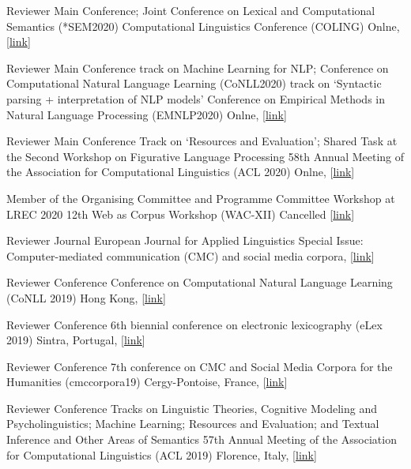 
        {Reviewer}
        {Main Conference; Joint Conference on Lexical and Computational Semantics (*SEM2020)}
        {Computational Linguistics Conference (COLING)}
        {Onlne, [\href{https://coling2020.org/}{link}]}
        {}

        {Reviewer}
        {Main Conference track on Machine Learning for NLP; Conference on
         Computational Natural Language Learning (CoNLL2020) track on `Syntactic parsing
         + interpretation of NLP models'} {Conference on Empirical Methods in Natural
         Language Processing (EMNLP2020)}
        {Onlne, [\href{https://coling2020.org/}{link}]}
        {}

        {Reviewer}
        {Main Conference Track on `Resources and Evaluation'; Shared Task at
         the Second Workshop on Figurative Language Processing}
        {58th Annual Meeting of the Association for Computational Linguistics (ACL 2020)}
        {Onlne, [\href{https://www.acl2020.org/}{link}]}
        {}

        {Member of the Organising Committee and Programme Committee}
        {Workshop at LREC 2020}
        {12th Web as Corpus Workshop (WAC-XII)}
        {Cancelled [\href{https://www.sigwac.org.uk/wiki/WAC-XII}{link}]}
        {}

        {Reviewer}
        {Journal}
        {European Journal for Applied Linguistics}
        {Special Issue: Computer-mediated communication (CMC) and social media
         corpora,
         [\href{https://www.degruyter.com/view/journals/eujal/7/2/eujal.7.issue-2.xml}{link}]}
        {}

        {Reviewer}
        {Conference}
        {Conference on Computational Natural Language Learning (CoNLL 2019)}
        {Hong Kong, [\href{https://www.conll.org/cfp-2019}{link}]}
        {}

        {Reviewer}
        {Conference}
        {6th biennial conference on electronic lexicography (eLex 2019)}
        {Sintra, Portugal, [\href{https://elex.link/elex2019/}{link}]}
        {}

        {Reviewer}
        {Conference}
        {7th conference on CMC and Social Media Corpora for the Humanities (cmccorpora19)}
        {Cergy-Pontoise, France, [\href{https://cmccorpora19.sciencesconf.org/}{link}]}
        {}

        {Reviewer}
        {Conference Tracks on Linguistic Theories, Cognitive Modeling and
        Psycholinguistics; Machine Learning; Resources and Evaluation; and
        Textual Inference and Other Areas of Semantics}
        {57th Annual Meeting of the Association for Computational Linguistics (ACL 2019)}
        {Florence, Italy, [\href{http://www.acl2019.org/}{link}]}
        {}


